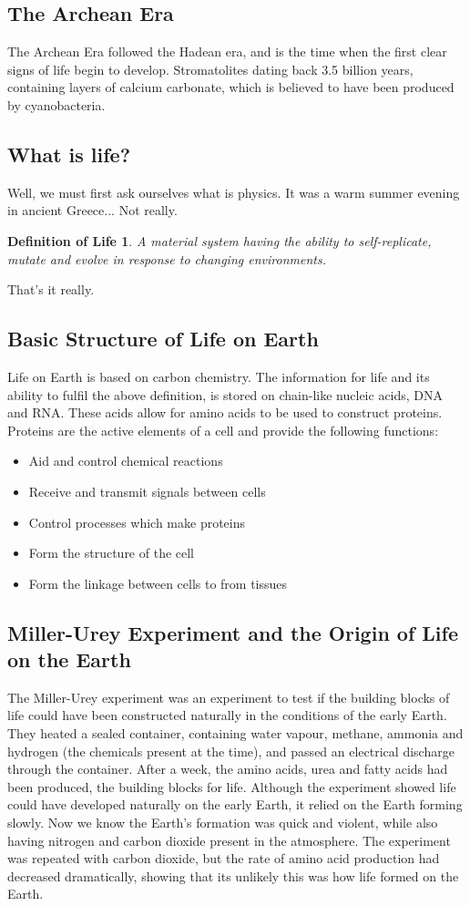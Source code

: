 \documentclass[12pt]{article}
\begin{document}
	\subsection{The Archean Era}
	The Archean Era followed the Hadean era, and is the time when the first clear signs of life begin to develop.
	Stromatolites dating back 3.5 billion years, containing layers of calcium carbonate, which is believed to have been produced by cyanobacteria.

	\subsection{What is life?}
	Well, we must first ask ourselves what is physics. It was a warm summer evening in ancient Greece...
	Not really.
	\newtheorem*{life}{Definition of Life}
	\begin{life}
		A material system having the ability to self-replicate, mutate and evolve in response to changing environments.
	\end{life}
	That's it really.

	\subsection{Basic Structure of Life on Earth}
	Life on Earth is based on carbon chemistry.
	The information for life and its ability to fulfil the above definition, is stored on chain-like nucleic acids, DNA and RNA.
	These acids allow for amino acids to be used to construct proteins. 
	Proteins are the active elements of a cell and provide the following functions:
	\begin{itemize}
		\item Aid and control chemical reactions
		\item Receive and transmit signals between cells
		\item Control processes which make proteins
		\item Form the structure of the cell
		\item Form the linkage between cells to from tissues
	\end{itemize}

	\subsection{Miller-Urey Experiment and the Origin of Life on the Earth}
	The Miller-Urey experiment was an experiment to test if the building blocks of life could have been constructed naturally in the conditions of the early Earth.
	They heated a sealed container, containing water vapour, methane, ammonia and hydrogen (the chemicals present at the time), and passed an electrical discharge through the container.
	After a week, the amino acids, urea and fatty acids had been produced, the building blocks for life.
	Although the experiment showed life could have developed naturally on the early Earth, it relied on the Earth forming slowly.
	Now we know the Earth's formation was quick and violent, while also having nitrogen and carbon dioxide present in the atmosphere.
	The experiment was repeated with carbon dioxide, but the rate of amino acid production had decreased dramatically, showing that its unlikely this was how life formed on the Earth.
\end{document}

